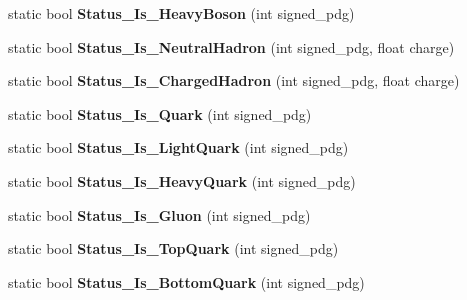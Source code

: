 \begin{DoxyCompactItemize}
\item 
\hypertarget{classToolSet_1_1CFlavor_ae8ac9069cfa65ff5e9fc72ba8d20cadd}{
static bool {\bfseries Status\_\-Is\_\-HeavyBoson} (int signed\_\-pdg)}
\label{classToolSet_1_1CFlavor_ae8ac9069cfa65ff5e9fc72ba8d20cadd}

\item 
\hypertarget{classToolSet_1_1CFlavor_adf35f90b5ebea29bd0d8d5e56f489cb9}{
static bool {\bfseries Status\_\-Is\_\-NeutralHadron} (int signed\_\-pdg, float charge)}
\label{classToolSet_1_1CFlavor_adf35f90b5ebea29bd0d8d5e56f489cb9}

\item 
\hypertarget{classToolSet_1_1CFlavor_aae7fd50e0b7bb8bd0d545ccfa9175b65}{
static bool {\bfseries Status\_\-Is\_\-ChargedHadron} (int signed\_\-pdg, float charge)}
\label{classToolSet_1_1CFlavor_aae7fd50e0b7bb8bd0d545ccfa9175b65}

\item 
\hypertarget{classToolSet_1_1CFlavor_aae85e0644519546ede71b7cbde2c8ec3}{
static bool {\bfseries Status\_\-Is\_\-Quark} (int signed\_\-pdg)}
\label{classToolSet_1_1CFlavor_aae85e0644519546ede71b7cbde2c8ec3}

\item 
\hypertarget{classToolSet_1_1CFlavor_a563b7a7bf722d25079edcb4b540480ff}{
static bool {\bfseries Status\_\-Is\_\-LightQuark} (int signed\_\-pdg)}
\label{classToolSet_1_1CFlavor_a563b7a7bf722d25079edcb4b540480ff}

\item 
\hypertarget{classToolSet_1_1CFlavor_a7ad5f2a8493d201e6ee738231a441cf2}{
static bool {\bfseries Status\_\-Is\_\-HeavyQuark} (int signed\_\-pdg)}
\label{classToolSet_1_1CFlavor_a7ad5f2a8493d201e6ee738231a441cf2}

\item 
\hypertarget{classToolSet_1_1CFlavor_ac661f95fcda90c2bbed4da9c1d9b6e1f}{
static bool {\bfseries Status\_\-Is\_\-Gluon} (int signed\_\-pdg)}
\label{classToolSet_1_1CFlavor_ac661f95fcda90c2bbed4da9c1d9b6e1f}

\item 
\hypertarget{classToolSet_1_1CFlavor_aca8d4cb3ebc6e281fb5405167e3314b2}{
static bool {\bfseries Status\_\-Is\_\-TopQuark} (int signed\_\-pdg)}
\label{classToolSet_1_1CFlavor_aca8d4cb3ebc6e281fb5405167e3314b2}

\item 
\hypertarget{classToolSet_1_1CFlavor_ac8fabfc8741b50016046e3eb9d6b9008}{
static bool {\bfseries Status\_\-Is\_\-BottomQuark} (int signed\_\-pdg)}
\label{classToolSet_1_1CFlavor_ac8fabfc8741b50016046e3eb9d6b9008}


\end{DoxyCompactItemize}
